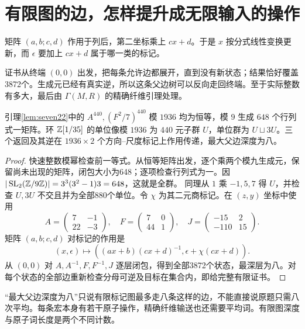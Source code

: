\section{有限图的边，怎样提升成无限输入的操作}
矩阵 $(a,b;c,d)$ 作用于列后，第二坐标乘上 $cx+d$。于是 $x$ 按分式线性变换更新，而 $\epsilon$ 要加上 $cx+d$ 属于哪一类的标记。

证书从终端 $(0,0)$ 出发，把每条允许边都展开，直到没有新状态；结果恰好覆盖3872个。生成元已经有真实逆，所以这条父边树可以反向走回终端。至于实际整数有多大，最后由 $\Gamma(M,R)$ 的精确纤维引理处理。
\begin{proposition}[二十二元有限轨道证书]\label{prop:seven-certificate}
引理\ref{lem:seven22}中的 $A^{440},(F^2/7)^{440}$ 模 $1936$ 均为恒等，模 $9$ 生成 $648$ 个行列式一矩阵。环 $\mathbb Z[1/35]$ 的单位像模 $1936$ 为 $440$ 元子群 $U$，单位群为 $U\sqcup3U$。三个返回及其逆在 $1936\times2$ 个方向--尺度标记上作用传递，最大父边深度为八。
\end{proposition}
\begin{proof}
快速整数模幂检查前一等式。从恒等矩阵出发，逐个乘两个模九生成元，保留尚未出现的矩阵，闭包大小为648；逐项检查行列式为一。因 $|\operatorname{SL}_2(\mathbb Z/9\mathbb Z)|=3^3(3^2-1)3=648$，这就是全群。
同理从 $1$ 乘 $-1,5,7$ 得 $U$，并检查 $U,3U$ 不交且并为全部880个单位。令 $\chi$ 为其二元商标记。在 $(z,y)$ 坐标中使用
\[
A=\begin{pmatrix}7&-1\\22&-3\end{pmatrix},\quad
F=\begin{pmatrix}7&0\\44&1\end{pmatrix},\quad
J=\begin{pmatrix}-15&2\\-110&15\end{pmatrix}.
\]
矩阵 $(a,b;c,d)$ 对标记的作用是
\[
(x,\epsilon)\longmapsto((ax+b)(cx+d)^{-1},\epsilon+\chi(cx+d)).
\]
从 $(0,0)$ 对 $A,A^{-1},F,F^{-1},J$ 逐层闭包，得到全部3872个状态，最深层为八。对每个状态的全部边重新检查分母可逆及目标在集合内，即给完整有限证书。
\end{proof}

“最大父边深度为八”只说有限标记图最多走八条这样的边，不能直接说原题只需八次平均。每条宏本身有若干原子操作，精确纤维输送也还需要平均词。有限图深度与原子词长度是两个不同计数。
